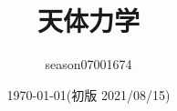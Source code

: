 \documentclass{jsarticle}
\title{天体力学}
\author{season07001674}
\date{\today (初版 2021/08/15)}
\begin{document}
\maketitle
\tableofcontents


\nocite{*}


\end{document}

